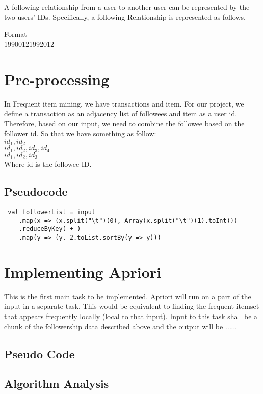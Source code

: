 \documentclass[11pt]{article}
\begin{document}
A following relationship from a user to another user can be represented by the two users' IDs. Specifically, a following Relationship is represented as follows.

Format \\
1990012\hspace{1cm}1992012 \\
\newpage
\section{Pre-processing}
In Frequent item mining, we have transactions and item. For our project, we define a transaction as an adjacency list of followees and item as a user id. Therefore, based on our input, we need to combine the followee based on the follower id. So that we have something as follow: \\

$id_1, id_2$ \\
$id_1, id_2, id_3, id_4$ \\
$id_1, id_2, id_3$ \\

Where id is the followee ID.

\subsection{Pseudocode}
\begin{lstlisting}
 val followerList = input
    .map(x => (x.split("\t")(0), Array(x.split("\t")(1).toInt)))
    .reduceByKey(_+_)
    .map(y => (y._2.toList.sortBy(y => y)))
\end{lstlisting}
\section{Implementing Apriori}
This is the first main task to be implemented. Apriori will run on a part of the input in a separate task. This would be equivalent to finding the frequent itemset that appears frequently locally (local to that input). Input to this task shall be a chunk of the followership data described above and the output will be ...... \\

\subsection {Pseudo Code}
\subsection {Algorithm Analysis}
\end{document}
